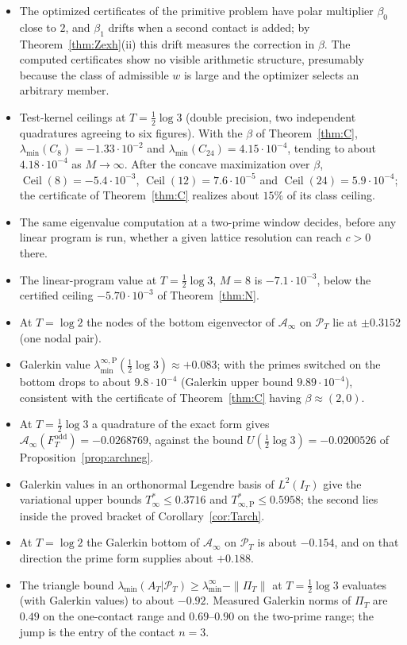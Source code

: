 \documentclass[11pt]{amsart}
\theoremstyle{definition}
\theoremstyle{remark}
\newcommand{\PT}{\mathcal P_T}
\newcommand{\IT}{I_T}
\newcommand{\lamA}{\lambda_{\min}(A_T|\PT)}
\newcommand{\Ainf}{\mathcal A_\infty}
\newcommand{\PiT}{\Pi_T}
\newcommand{\laminf}{\lambda^{\infty}_{\min}}
\newcommand{\laminfP}{\lambda^{\infty,\mathrm P}_{\min}}
\begin{document}
\begin{itemize}
\item The optimized certificates of the primitive problem have polar multiplier $\beta_0$ close to $2$, and $\beta_1$ drifts when a second contact is added; by Theorem~\ref{thm:Zexh}(ii) this drift measures the correction in $\beta$. The computed certificates show no visible arithmetic structure, presumably because the class of admissible $w$ is large and the optimizer selects an arbitrary member.
\item Test-kernel ceilings at $T=\frac12\log3$ (double precision, two independent quadratures agreeing to six figures). With the $\beta$ of Theorem~\ref{thm:C}, $\lambda_{\min}(C_8)=-1.33\cdot10^{-2}$ and $\lambda_{\min}(C_{24})=4.15\cdot10^{-4}$, tending to about $4.18\cdot10^{-4}$ as $M\to\infty$. After the concave maximization over $\beta$, $\operatorname{Ceil}(8)=-5.4\cdot10^{-3}$, $\operatorname{Ceil}(12)=7.6\cdot10^{-5}$ and $\operatorname{Ceil}(24)=5.9\cdot10^{-4}$; the certificate of Theorem~\ref{thm:C} realizes about $15\%$ of its class ceiling.
\item The same eigenvalue computation at a two-prime window decides, before any linear program is run, whether a given lattice resolution can reach $c>0$ there.
\item The linear-program value at $T=\frac12\log3$, $M=8$ is $-7.1\cdot10^{-3}$, below the certified ceiling $-5.70\cdot10^{-3}$ of Theorem~\ref{thm:N}.
\item At $T=\log2$ the nodes of the bottom eigenvector of $\Ainf$ on $\PT$ lie at $\pm0.3152$ (one nodal pair).
\item Galerkin value $\laminfP(\frac12\log3)\approx+0.083$; with the primes switched on the bottom drops to about $9.8\cdot10^{-4}$ (Galerkin upper bound $9.89\cdot10^{-4}$), consistent with the certificate of Theorem~\ref{thm:C} having $\beta\approx(2,0)$.
\item At $T=\frac12\log3$ a quadrature of the exact form gives $\Ainf(F^{\mathrm{odd}}_T)=-0.0268769$, against the bound $U(\frac12\log3)=-0.0200526$ of Proposition~\ref{prop:archneg}.
\item Galerkin values in an orthonormal Legendre basis of $L^2(\IT)$ give the variational upper bounds $T^*_\infty\le0.3716$ and $T^*_{\infty,\mathrm P}\le0.5958$; the second lies inside the proved bracket of Corollary~\ref{cor:Tarch}.
\item At $T=\log2$ the Galerkin bottom of $\Ainf$ on $\PT$ is about $-0.154$, and on that direction the prime form supplies about $+0.188$.
\item The triangle bound $\lamA\ge\laminf-\|\PiT\|$ at $T=\frac12\log3$ evaluates (with Galerkin values) to about $-0.92$. Measured Galerkin norms of $\PiT$ are $0.49$ on the one-contact range and $0.69$--$0.90$ on the two-prime range; the jump is the entry of the contact $n=3$.

\end{itemize}
\end{document}
